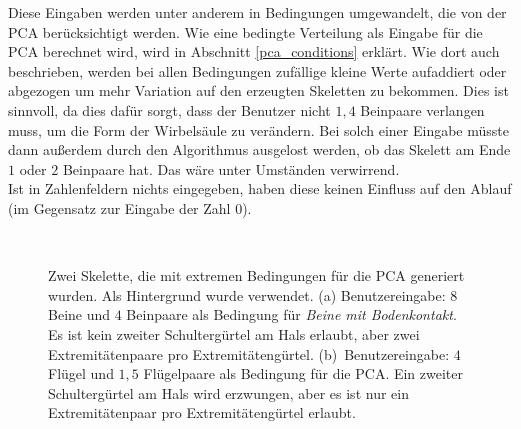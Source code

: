 Diese Eingaben werden unter anderem in Bedingungen umgewandelt, die von der PCA berücksichtigt werden. Wie eine bedingte Verteilung als Eingabe für die PCA berechnet wird, wird in Abschnitt \ref{pca_conditions} erklärt. Wie dort auch beschrieben, werden bei allen Bedingungen zufällige kleine Werte aufaddiert oder abgezogen um mehr Variation auf den erzeugten Skeletten zu bekommen. Dies ist sinnvoll, da dies dafür sorgt, dass der Benutzer nicht $1{,}4$ Beinpaare verlangen muss, um \zb die Form der Wirbelsäule zu verändern. Bei solch einer Eingabe müsste dann außerdem durch den Algorithmus ausgelost werden, ob das Skelett am Ende $1$ oder $2$ Beinpaare hat. Das wäre unter Umständen verwirrend.\\
Ist in Zahlenfeldern nichts eingegeben, haben diese keinen Einfluss auf den Ablauf (im Gegensatz zur Eingabe der Zahl $0$).

\begin{figure}
 ~
 
 \caption{Zwei Skelette, die mit extremen Bedingungen für die PCA generiert wurden. Als Hintergrund wurde \cite{background} verwendet. (a) Benutzereingabe: $8$ Beine und $4$ Beinpaare als Bedingung für \emph{Beine mit Bodenkontakt}. Es ist kein zweiter Schultergürtel am Hals erlaubt, aber zwei Extremitätenpaare pro Extremitätengürtel. (b)~Benutzereingabe: $4$ Flügel und $1{,}5$ Flügelpaare als Bedingung für die PCA. Ein zweiter Schultergürtel am Hals wird erzwungen, aber es ist nur ein Extremitätenpaar pro Extremitätengürtel erlaubt.}
 \label{more_extremities}
\end{figure}


